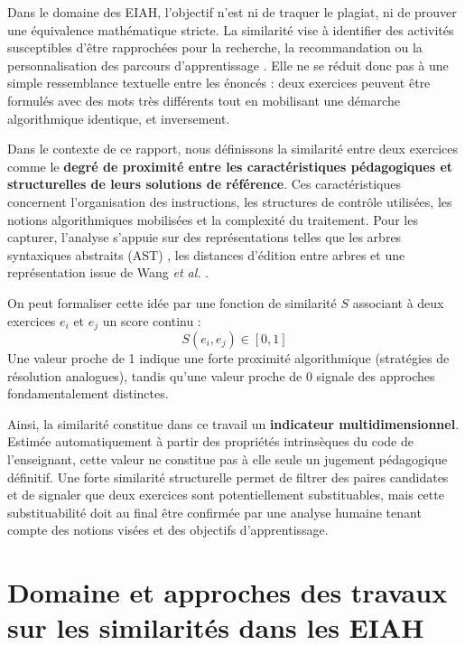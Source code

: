 \documentclass[12pt,a4paper,oneside]{report}
\begin{document}
Dans le domaine des EIAH, l'objectif n'est ni de traquer le plagiat, ni de prouver une équivalence mathématique stricte. La similarité vise à identifier des activités susceptibles d'être rapprochées pour la recherche, la recommandation ou la personnalisation des parcours d'apprentissage \cite{liu_2018,tian_2022}. Elle ne se réduit donc pas à une simple ressemblance textuelle entre les énoncés : deux exercices peuvent être formulés avec des mots très différents tout en mobilisant une démarche algorithmique identique, et inversement.

Dans le contexte de ce rapport, nous définissons la similarité entre deux
 exercices comme le \textbf{degré de proximité entre les caractéristiques 
 pédagogiques et structurelles de leurs solutions de référence}. Ces
  caractéristiques concernent l'organisation des instructions, les 
  structures de contrôle utilisées, les notions algorithmiques mobilisées 
  et la complexité du traitement. Pour les capturer, l'analyse s'appuie sur
   des représentations telles que les arbres syntaxiques abstraits (AST) \cite{baxter_clone_1998},
    les distances d'édition entre arbres \cite{zhang_simple_1989} et une représentation issue de Wang \emph{et al.} \cite{wang_detection_2014}.


On peut formaliser cette idée par une fonction de similarité $S$ associant à deux exercices $e_i$ et $e_j$ un score continu :
$$S(e_i, e_j) \in [0, 1]$$
Une valeur proche de 1 indique une forte proximité algorithmique (stratégies de résolution analogues), tandis qu'une valeur proche de 0 signale des approches fondamentalement distinctes. 

Ainsi, la similarité constitue dans ce travail un \textbf{indicateur multidimensionnel}.
 Estimée automatiquement à partir des propriétés intrinsèques du code de l'enseignant, cette valeur
  ne constitue pas à elle seule un jugement pédagogique définitif. Une forte similarité structurelle
   permet de filtrer des paires candidates et de signaler que deux exercices sont potentiellement 
   substituables, mais cette substituabilité doit au final être confirmée par une
    analyse humaine tenant compte des notions visées et des objectifs d'apprentissage.



\section{Domaine et approches des travaux sur les similarités dans les EIAH}
\label{sec:domaines}
\end{document}
